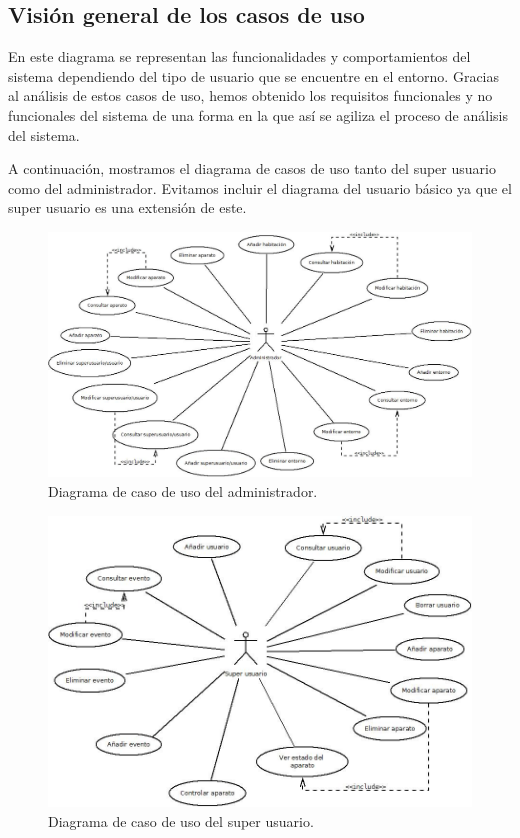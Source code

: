 \subsection{Visi\'on general de los casos de uso}
En este diagrama se representan las funcionalidades y comportamientos del sistema dependiendo del tipo de usuario que se encuentre en el entorno. Gracias al an\'alisis de estos casos de uso, hemos obtenido los requisitos funcionales y no funcionales del sistema de una forma en la que as\'i se agiliza el proceso de an\'alisis del sistema.
 
A continuaci\'on, mostramos el diagrama de casos de uso tanto del super usuario como del administrador. Evitamos incluir el diagrama del usuario b\'asico ya que el super usuario es una extensi\'on de este.
\begin{figure}
	\centering
	\includegraphics[scale=0.5]{4.Disenio/Imagenes/CasosDeUsoDeAdministrador}
	\caption{Diagrama de caso de uso del administrador.}
\end{figure}

\begin{figure}
	\centering
	\includegraphics[scale=0.5]{4.Disenio/Imagenes/CasosDeUsoSuperUsuario}
	\caption{Diagrama de caso de uso del super usuario.}
\end{figure}

